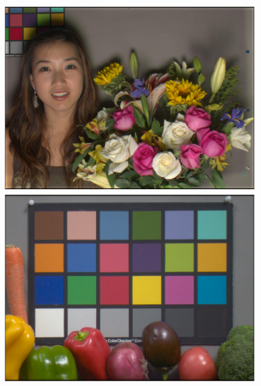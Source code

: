 \documentclass[]{spie}
\begin{document}
\begin{figure}[t]
\begin{center}
\begin{minipage}[b]{0.245\textwidth}
 \centering\small{}
\end{minipage}
\begin{minipage}[b]{0.245\textwidth}
 \includegraphics[width=\textwidth]{Fig3/srgbI_AsianFemaleWithFlowers_RGBW1_Tungsten1_opt1}
 \includegraphics[width=\textwidth]{Fig3/srgbI_Vegetables_RGBW1_Tungsten1_opt1}
 \centering\small{}
\end{minipage}
\begin{minipage}[b]{0.245\textwidth}

\end{minipage}
\end{center}
\end{figure}
\end{document}
